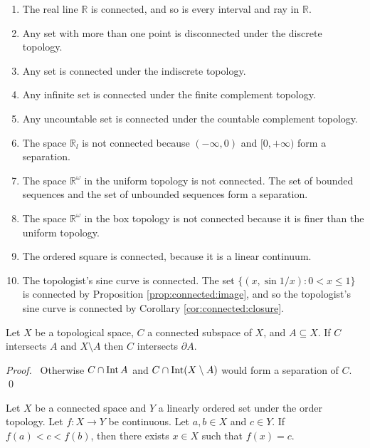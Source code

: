 \begin{ex}
  \begin{enumerate}
    \item   The real line $\mathbb{R}$ is connected, and so is every interval and ray in $\mathbb{R}$.
    \item Any set with more than one point is disconnected under the discrete topology.
    \item Any set is connected under the indiscrete topology.
    \item Any infinite set is connected under the finite complement topology.
    \item Any uncountable set is connected under the countable complement topology.
    \item The space $\mathbb{R}_l$ is not connected because $(- \infty, 0)$ and $[0, + \infty)$ form a separation.
    \item The space $\mathbb{R}^\omega$ in the uniform topology is not connected. The set of bounded sequences and the set of unbounded sequences form a separation.
    \item The space $\mathbb{R}^\omega$ in the box topology is not connected because it is finer than the uniform topology.
    \item The ordered square is connected, because it is a linear continuum.
    \item The topologist's sine curve is connected. The set $\{ (x, \sin 1/x) : 0 < x \leq 1 \}$ is connected by Proposition \ref{prop:connected:image}, and so the topologist's sine curve is connected by Corollary \ref{cor:connected:closure}.
  \end{enumerate}
\end{ex}

\begin{prop}
  Let $X$ be a topological space, $C$ a connected subspace of $X$, and $A \subseteq X$. If $C$ intersects $A$ and $X \setminus A$ then $C$ intersects $\partial A$.
\end{prop}

\begin{proof}
  \pf\ Otherwise $C \cap \operatorname{Int} A$ and $C \cap \operatorname{Int} (X \setminus A)$ would form a separation of $C$. \qed
\end{proof}

\begin{thm}
  Let $X$ be a connected space and $Y$ a linearly ordered set under the order topology. Let $f : X \rightarrow Y$ be continuous. Let $a,b \in X$ and $c \in Y$. If $f(a) < c < f(b)$, then there exists $x \in X$ such that $f(x) = c$.
\end{thm}


